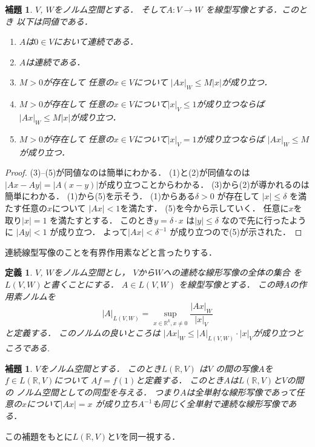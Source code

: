 \documentclass[leqno, a4paper, 12pt]{jsarticle}
\newtheorem{lem}[thm]{補題}
\newtheorem{df}[thm]{定義}
\newcommand{\rr}{\mathbb{R}}
\begin{document}
\begin{lem}
$V$, $W$をノルム空間とする．
そして$A: V\to W$
を線型写像とする．このとき
以下は同値である．
\begin{enumerate}
\item 
$A$は$0\in V$において連続である．
\item 
$A$は連続である．
\item 
$M>0$が存在して
任意の$x\in V$について
$|Ax|_{W}\le M|x|$が成り立つ．

\item 
$M>0$が存在して
任意の$x\in V$について$|x|_{V}\le 1$が成り立つならば
$|Ax|_{W}\le M|x|$が成り立つ．

\item 
$M>0$が存在して
任意の$x\in V$について$|x|_{V}= 1$が成り立つならば
$|Ax|_{W}\le M$が成り立つ．

\end{enumerate}
\end{lem}
\begin{proof}
(3)--(5)が同値なのは簡単にわかる．
(1)と(2)が同値なのは
$|Ax-Ay|=|A(x-y)|$が成り立つことからわかる．
(3)から(2)が導かれるのは簡単にわかる．
(1)から(5)を示そう．
(1)からある$\delta>0$
が存在して
$|x|\le \delta$
を満たす任意の$x$について
$|Ax|<1$を満たす．
(5)を今から示していく．
任意に$x$を取り$|x|=1$
を満たすとする．
このとき$y=\delta\cdot x$
は$|y|\le \delta$
なので先に行ったように
$|Ay|<1$
が成り立つ．
よって$|Ax|<\delta^{-1}$
が成り立つので(5)が示された．
\end{proof}

連続線型写像のことを有界作用素などと言ったりする．

\begin{df}
$V$, $W$をノルム空間とし，
$V$から$W$への連続な線形写像の全体の集合
を$L(V, W)$と書くことにする．
$A\in L(V, W)$
を線型写像とする．
この時$A$の作用素ノルムを
\[
|A|_{L(V, W)}=\sup_{x\in \rr^{k}, x\neq 0}\frac{|Ax|_{W}}{|x|_{V}}
\]
と定義する．
このノルムの良いところは
$|Ax|_{W}\le |A|_{L(V, W)}\cdot |x|_{V}$が成り立つところである.

\end{df}

\begin{lem}
$V$をノルム空間とする．
このとき$L(\rr, V)$
は$V$
の間の写像$A$を$f\in L(\rr, V)$について
$Af=f(1)$と定義する．
このとき$A$は$L(\rr, V)$と$V$の間の
ノルム空間としての同型を与える．
つまり$A$は全単射な線形写像であって任意の$x$について$|Ax|=x$
が成り立ち$A^{-1}$も同じく全単射で連続な線形写像である．
\end{lem}
この補題をもとに$L(\rr, V)$と$V$を同一視する．
\end{document}
